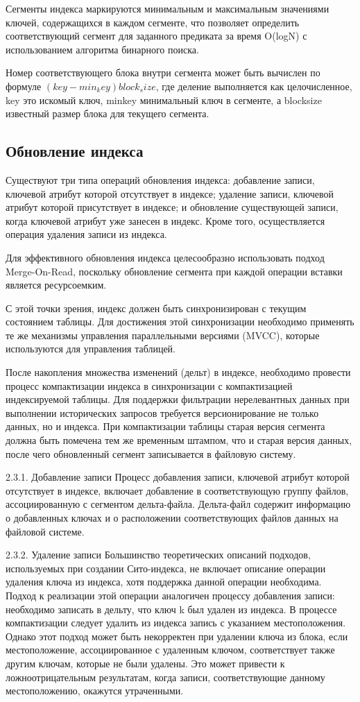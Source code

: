 Сегменты индекса маркируются минимальным и максимальным значениями ключей, содержащихся в каждом сегменте, что позволяет определить соответствующий сегмент для заданного предиката за время O(logN) с использованием алгоритма бинарного поиска.

Номер соответствующего блока внутри сегмента может быть вычислен по формуле $(key − min_key)  block_size$, где деление выполняется как 
целочисленное, key  это искомый ключ, minkey  минимальный ключ в сегменте, а blocksize известный размер блока для текущего сегмента.

\subsection{Обновление индекса}

Существуют три типа операций обновления индекса: добавление записи, ключевой атрибут которой отсутствует в индексе; удаление записи, ключевой атрибут которой присутствует в индексе; и обновление существующей записи, когда ключевой атрибут уже занесен в индекс. Кроме того, осуществляется операция удаления записи из индекса.

Для эффективного обновления индекса целесообразно использовать подход Merge-On-Read, поскольку обновление сегмента при каждой операции вставки является ресурсоемким.

С этой точки зрения, индекс должен быть синхронизирован с текущим состоянием таблицы. Для достижения этой синхронизации необходимо применять те же механизмы управления параллельными версиями (MVCC), которые используются для управления таблицей.

После накопления множества изменений (дельт) в индексе, необходимо провести процесс компактизации индекса в синхронизации с компактизацией индексируемой таблицы. Для поддержки фильтрации нерелевантных данных при выполнении исторических запросов требуется версионирование не только данных, но и индекса. При компактизации таблицы старая версия сегмента должна быть помечена тем же временным штампом, что и старая версия данных, после чего обновленный сегмент записывается в файловую систему.

2.3.1. Добавление записи
Процесс добавления записи, ключевой атрибут которой отсутствует в индексе, включает добавление в соответствующую группу файлов, ассоциированную с сегментом дельта-файла. Дельта-файл содержит информацию о добавленных ключах и о расположении соответствующих файлов данных на файловой системе.

2.3.2. Удаление записи
Большинство теоретических описаний подходов, используемых при создании Сито-индекса, не включает описание операции удаления ключа из индекса, хотя поддержка данной операции необходима. Подход к реализации этой операции аналогичен процессу добавления записи: необходимо записать в дельту, что ключ k был удален из индекса. В процессе компактизации следует удалить из индекса запись с указанием местоположения. Однако этот подход может быть некорректен при удалении ключа из блока, если местоположение, ассоциированное с удаленным ключом, соответствует также другим ключам, которые не были удалены. Это может привести к ложноотрицательным результатам, когда записи, соответствующие данному местоположению, окажутся утраченными.

